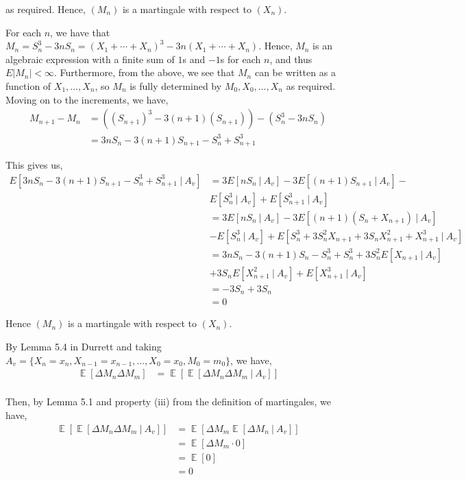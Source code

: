 \documentclass[12pt]{article}
\newenvironment{problem}[2][Problem]{\begin{trivlist}
\item[\hskip \labelsep {\bfseries #1}\hskip \labelsep {\bfseries #2.}]}{\end{trivlist}}
\DeclareMathOperator*{\E}{\mathbb{E}}
\begin{document}
as required. Hence, $(M_n)$ is a martingale with respect to $(X_n)$.

\begin{problem}{II}
\end{problem}

For each $n$, we have that $M_n = S_n^3 - 3nS_n = (X_1 + \cdots + X_n)^3 -  3n(X_1 + \cdots + X_n)$. Hence, $M_n$ is an algebraic expression with a finite sum of $1$s and $-1$s for each $n$, and thus $E|M_n| < \infty$. Furthermore, from the above, we see that $M_n$ can be written as a function of $X_1, \ldots, X_n$, so $M_n$ is fully determined by $M_0, X_0, \ldots, X_n$ as required.\\

Moving on to the increments, we have,
\begin{align*}
M_{n+1} - M_n &= ((S_{n+1})^3 - 3(n+1)(S_{n+1})) - (S_n^3 - 3nS_n)\\
&= 3nS_n - 3(n+1)S_{n+1} - S_n^3 + S_{n+1}^3
\end{align*}

This gives us,
\begin{align*}
E\left[3nS_n - 3(n+1)S_{n+1} - S_n^3 + S_{n+1}^3 \ | \ A_v\right] &= 3E\left[nS_n \ | \ A_v\right] - 3E\left[(n+1)S_{n+1} \ | \ A_v\right] -\\
&E\left[S_n^3 \ | \ A_v\right] + E\left[S_{n+1}^3 \ | \ A_v\right]\\
&= 3E\left[nS_n \ | \ A_v\right] - 3E\left[(n+1)(S_{n} + X_{n+1}) \ | \ A_v\right] \\
&- E\left[S_n^3 \ | \ A_v\right] + E\left[S_n^3 + 3S_n^2X_{n+1} + 3S_nX_{n+1}^2 + X_{n+1}^3 \ | \ A_v\right]\\
&= 3nS_n - 3(n+1)S_{n} - S_n^3 + S_{n}^3 + 3S_n^2 E\left[X_{n+1} \ | \ A_v \right]\\
&+ 3S_nE[X_{n+1}^2 \ | \ A_v] + E[X_{n+1}^3 \ | \ A_v]\\
&= -3S_n + 3S_n\\
&= 0
\end{align*}

Hence $(M_n)$ is a martingale with respect to $(X_n)$.

\begin{problem}{III}
\end{problem}

By Lemma 5.4 in Durrett and taking $A_v = \{X_n = x_n, X_{n-1} = x_{n-1}, \ldots, X_0 = x_0, M_0 = m_0\}$, we have,
\begin{align*}
\E\left[\Delta M_n \Delta M_m\right] &= \E\left[\E\left[\Delta M_n \Delta M_m \ | \ A_v\right]\right]\\
\end{align*}

Then, by Lemma 5.1 and property (iii) from the definition of martingales, we have,
\begin{align*}
\E\left[\E\left[\Delta M_n \Delta M_m \ | \ A_v\right]\right] &= \E\left[\Delta M_m\E\left[\Delta M_n  \ | \ A_v\right]\right]\\
&= \E\left[\Delta M_m \cdot 0 \right]\\
&= \E\left[0\right]\\
&= 0
\end{align*}
\end{document}
